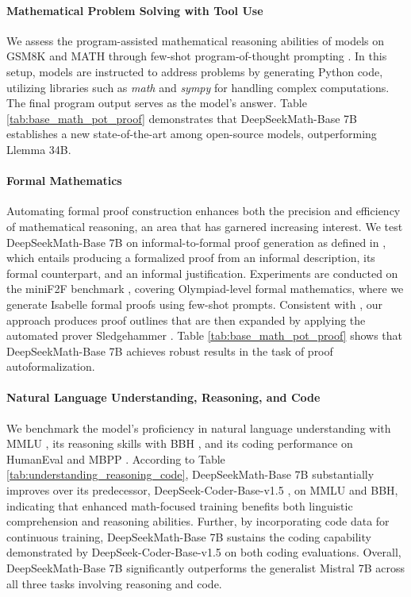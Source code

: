 \paragraph{Mathematical Problem Solving with Tool Use} We assess the program-assisted mathematical reasoning abilities of models on GSM8K and MATH through few-shot program-of-thought prompting \citep{pot,pal}. In this setup, models are instructed to address problems by generating Python code, utilizing libraries such as \textit{math} and \textit{sympy} for handling complex computations. The final program output serves as the model’s answer. Table \ref{tab:base_math_pot_proof} demonstrates that DeepSeekMath-Base 7B establishes a new state-of-the-art among open-source models, outperforming Llemma 34B.

\paragraph{Formal Mathematics}

Automating formal proof construction enhances both the precision and efficiency of mathematical reasoning, an area that has garnered increasing interest. We test DeepSeekMath-Base 7B on informal-to-formal proof generation as defined in \citep{dsp_proof}, which entails producing a formalized proof from an informal description, its formal counterpart, and an informal justification. Experiments are conducted on the miniF2F benchmark \citep{minif2f}, covering Olympiad-level formal mathematics, where we generate Isabelle formal proofs using few-shot prompts. Consistent with \cite{dsp_proof}, our approach produces proof outlines that are then expanded by applying the automated prover Sledgehammer \citep{sledgehammer}. Table \ref{tab:base_math_pot_proof} shows that DeepSeekMath-Base 7B achieves robust results in the task of proof autoformalization.

\paragraph{Natural Language Understanding, Reasoning, and Code}

We benchmark the model’s proficiency in natural language understanding with MMLU \citep{mmlu}, its reasoning skills with BBH \citep{bbh}, and its coding performance on HumanEval \citep{codex} and MBPP \citep{mbpp}. According to Table \ref{tab:understanding_reasoning_code}, DeepSeekMath-Base 7B substantially improves over its predecessor, DeepSeek-Coder-Base-v1.5 \citep{deepseek-coder}, on MMLU and BBH, indicating that enhanced math-focused training benefits both linguistic comprehension and reasoning abilities. Further, by incorporating code data for continuous training, DeepSeekMath-Base 7B sustains the coding capability demonstrated by DeepSeek-Coder-Base-v1.5 on both coding evaluations. Overall, DeepSeekMath-Base 7B significantly outperforms the generalist Mistral 7B \citep{mistral} across all three tasks involving reasoning and code.


